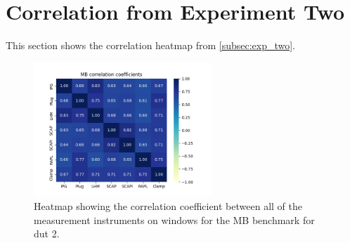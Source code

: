 \section*{Correlation from Experiment Two}\label{app:cor_exp_two}

This section shows the correlation heatmap from \cref{subsec:exp_two}.

\begin{figure}[H]
    \centering
    \hspace*{-1cm} %
    \includegraphics[width=0.6\textwidth]{figures/Mandelbrot_ex2.png}
    \caption{Heatmap showing the correlation coefficient between all of the measurement instruments on windows for the MB benchmark for dut 2.}
    \label{fig:mandelbrotCorrDut2}
\end{figure}